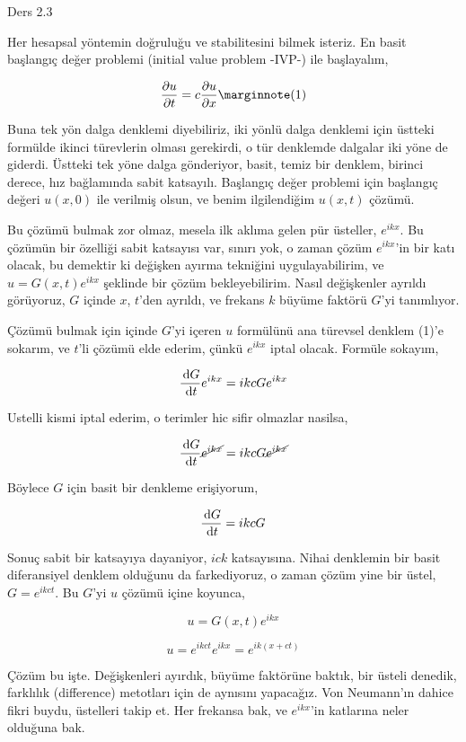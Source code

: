 \documentclass[12pt,fleqn]{article}\usepackage{../../common}
\begin{document}
Ders 2.3

Her hesapsal yöntemin doğruluğu ve stabilitesini bilmek isteriz. En basit
başlangıç değer problemi (initial value problem -IVP-) ile başlayalım,

$$
\frac{\partial u}{\partial t} =
c \frac{\partial u}{\partial x}
\mlabel{1}
$$

Buna tek yön dalga denklemi diyebiliriz, iki yönlü dalga denklemi için üstteki
formülde ikinci türevlerin olması gerekirdi, o tür denklemde dalgalar iki yöne
de giderdi. Üstteki tek yöne dalga gönderiyor, basit, temiz bir denklem, birinci
derece, hız bağlamında sabit katsayılı. Başlangıç değer problemi için başlangıç
değeri $u(x,0)$ ile verilmiş olsun, ve benim ilgilendiğim $u(x,t)$ çözümü.

Bu çözümü bulmak zor olmaz, mesela ilk aklıma gelen pür üsteller, $e^{ikx}$.  Bu
çözümün bir özelliği sabit katsayısı var, sınırı yok, o zaman çözüm $e^{ikx}$'in
bir katı olacak, bu demektir ki değişken ayırma tekniğini uygulayabilirim, ve $u
= G(x,t) e^{ikx}$ şeklinde bir çözüm bekleyebilirim. Nasıl değişkenler ayrıldı
görüyoruz, $G$ içinde $x$, $t$'den ayrıldı, ve frekans $k$ büyüme faktörü $G$'yi
tanımlıyor.

Çözümü bulmak için içinde $G$'yi içeren $u$ formülünü ana türevsel denklem (1)'e
sokarım, ve $t$'li çözümü elde ederim, çünkü $e^{ikx}$ iptal olacak. Formüle
sokayım,

$$
\frac{\,\mathrm{d} G}{\,\mathrm{d} t} e^{ikx} = ikc G e^{ikx}
$$

Ustelli kismi iptal ederim, o terimler hic sifir olmazlar nasilsa,

$$
\frac{\,\mathrm{d} G}{\,\mathrm{d} t} \cancel{e^{ikx}} = ikc G \cancel{e^{ikx}}
$$

Böylece $G$ için basit bir denkleme erişiyorum,

$$
\frac{\,\mathrm{d} G}{\,\mathrm{d} t} = ikc G 
$$

Sonuç sabit bir katsayıya dayaniyor, $ick$ katsayısına. Nihai denklemin bir
basit diferansiyel denklem olduğunu da farkediyoruz, o zaman çözüm yine
bir üstel, $G = e^{ikc t}$. Bu $G$'yi $u$ çözümü içine koyunca, 

$$
u = G(x,t) e^{ikx}
$$

$$
u = e^{ikc t} e^{ikx} = e^{ik(x + ct)} 
$$

Çözüm bu işte. Değişkenleri ayırdık, büyüme faktörüne baktık, bir üsteli
denedik, farklılık (difference) metotları için de aynısını yapacağız. Von
Neumann'ın dahice fikri buydu, üstelleri takip et. Her frekansa bak, ve
$e^{ikx}$'in katlarına neler olduğuna bak. 
\end{document}
